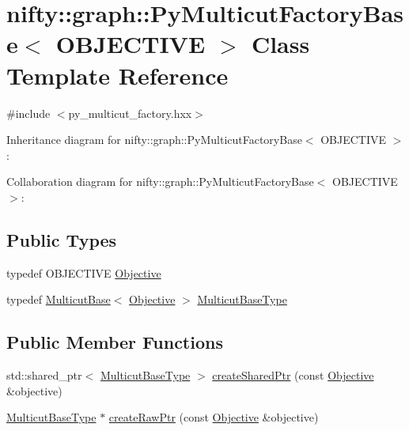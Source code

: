 \hypertarget{classnifty_1_1graph_1_1PyMulticutFactoryBase}{}\section{nifty\+:\+:graph\+:\+:Py\+Multicut\+Factory\+Base$<$ O\+B\+J\+E\+C\+T\+I\+V\+E $>$ Class Template Reference}
\label{classnifty_1_1graph_1_1PyMulticutFactoryBase}


{\ttfamily \#include $<$py\+\_\+multicut\+\_\+factory.\+hxx$>$}



Inheritance diagram for nifty\+:\+:graph\+:\+:Py\+Multicut\+Factory\+Base$<$ O\+B\+J\+E\+C\+T\+I\+V\+E $>$\+:


Collaboration diagram for nifty\+:\+:graph\+:\+:Py\+Multicut\+Factory\+Base$<$ O\+B\+J\+E\+C\+T\+I\+V\+E $>$\+:
\subsection*{Public Types}
\begin{DoxyCompactItemize}
\item 
typedef O\+B\+J\+E\+C\+T\+I\+V\+E \hyperlink{classnifty_1_1graph_1_1PyMulticutFactoryBase_a539d1efb4b043f95428398c5f48885f5}{Objective}
\item 
typedef \hyperlink{classnifty_1_1graph_1_1MulticutBase}{Multicut\+Base}$<$ \hyperlink{classnifty_1_1graph_1_1MulticutFactoryBase_a4c305b0d8842e47659998480de5ffcc5}{Objective} $>$ \hyperlink{classnifty_1_1graph_1_1PyMulticutFactoryBase_ab40c9985c0652b658d8fd8b221c55817}{Multicut\+Base\+Type}
\end{DoxyCompactItemize}
\subsection*{Public Member Functions}
\begin{DoxyCompactItemize}
\item 
std\+::shared\+\_\+ptr$<$ \hyperlink{classnifty_1_1graph_1_1MulticutFactoryBase_a301de1603477785a351914c2bbcf8164}{Multicut\+Base\+Type} $>$ \hyperlink{classnifty_1_1graph_1_1PyMulticutFactoryBase_a199dade0360b83782ee98f630d5e6c59}{create\+Shared\+Ptr} (const \hyperlink{classnifty_1_1graph_1_1MulticutFactoryBase_a4c305b0d8842e47659998480de5ffcc5}{Objective} \&objective)
\item 
\hyperlink{classnifty_1_1graph_1_1MulticutFactoryBase_a301de1603477785a351914c2bbcf8164}{Multicut\+Base\+Type} $\ast$ \hyperlink{classnifty_1_1graph_1_1PyMulticutFactoryBase_a9d1fc90f057e93d227d23ff56058ce33}{create\+Raw\+Ptr} (const \hyperlink{classnifty_1_1graph_1_1MulticutFactoryBase_a4c305b0d8842e47659998480de5ffcc5}{Objective} \&objective)
\end{DoxyCompactItemize}


